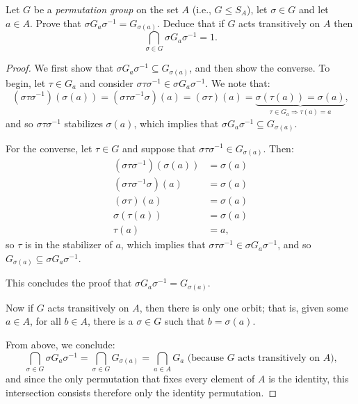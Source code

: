 \documentclass{article}
\begin{document}
Let $G$ be a \emph{permutation group} on the set $A$ (i.e., $G \leq S_A$), let $\sigma \in G$ and let $a \in A$. Prove that $\sigma G_a \sigma^{-1} = G_{\sigma(a)}$. Deduce that if $G$ acts transitively on $A$ then
\begin{equation*}
    \bigcap_{\sigma \in G} \sigma G_a \sigma^{-1} = 1.
\end{equation*}

\begin{proof}
    We first show that $\sigma G_a \sigma^{-1} \subseteq G_{\sigma(a)}$, and then show the converse. To begin, let $\tau \in G_a$ and consider $\sigma \tau \sigma^{-1} \in \sigma G_a \sigma^{-1}$. We note that:
    \begin{equation*}
        (\sigma \tau \sigma^{-1})(\sigma(a)) = (\sigma \tau \sigma^{-1} \sigma)(a) = (\sigma \tau)(a) = \underbrace{\sigma(\tau(a)) = \sigma(a)}_{\tau \in G_a \Rightarrow \tau(a) = a},
    \end{equation*}
    and so $\sigma \tau \sigma^{-1}$ stabilizes $\sigma(a)$, which implies that $\sigma G_a \sigma^{-1} \subseteq G_{\sigma(a)}$.

    For the converse, let $\tau \in G$ and suppose that $\sigma \tau \sigma^{-1} \in G_{\sigma(a)}$. Then:
    \begin{align*}
        (\sigma \tau \sigma^{-1})(\sigma(a)) &= \sigma(a) \\
        (\sigma \tau \sigma^{-1} \sigma)(a) &= \sigma(a) \\
        (\sigma \tau)(a) &= \sigma(a) \\
        \sigma(\tau(a)) &= \sigma(a) \\
        \tau(a) &= a,
    \end{align*}
    so $\tau$ is in the stabilizer of $a$, which implies that $\sigma \tau \sigma^{-1} \in \sigma G_a \sigma^{-1}$, and so $G_{\sigma(a)} \subseteq \sigma G_a \sigma^{-1}$.
    
    This concludes the proof that $\sigma G_a \sigma^{-1} = G_{\sigma(a)}$.

    Now if $G$ acts transitively on $A$, then there is only one orbit; that is, given some $a \in A$, for all $b \in A$, there is a $\sigma \in G$ such that $b = \sigma(a)$.

    From above, we conclude:
    \begin{equation*}
        \bigcap_{\sigma \in G} \sigma G_a \sigma^{-1} = \bigcap_{\sigma \in G} G_{\sigma(a)} =
        \bigcap_{a \in A} G_a \text{ (because $G$ acts transitively on $A$),}
    \end{equation*}
    and since the only permutation that fixes every element of $A$ is the identity, this intersection consists therefore only the identity permutation.
\end{proof}
\end{document}
